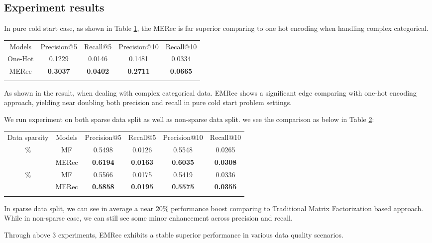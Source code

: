 \subsection{Experiment results}
In pure cold start case, as shown in Table \ref{tbl1}, the MERec is far superior comparing to one hot encoding when handling complex categorical.

\begin{table}
    {\begin{tabular}{@{}ccccc@{}}\toprule
    Models & Precision@5 & Recall@5 & Precision@10 & Recall@10 \\
    \colrule
    One-Hot\hphantom{00} & \hphantom{0} 0.1229 & \hphantom{0} 0.0146 & 0.1481 & 0.0334 \\
    MERec\hphantom{00} & \hphantom{0} \textbf{0.3037} & \hphantom{0} \textbf{0.0402} & \textbf{0.2711} & \textbf{0.0665} \\
    
    \botrule
    \end{tabular}
    }\label{tbl1}
    \end{table}
As shown in the result, when dealing with complex categorical data. EMRec shows a significant edge comparing with one-hot encoding approach, yielding near doubling both precision and recall in pure cold start problem settings.

We run experiment on both sparse data split as well as non-sparse data split. we see the comparison as below in Table \ref{tbl2}: 
\begin{table}
    {\begin{tabular}{@{}cccccc@{}}\toprule
    Data sparsity &Models & Precision@5 & Recall@5 & Precision@10 & Recall@10 \\
    \colrule
    1.1\%&MF\hphantom{00} & \hphantom{0} 0.5498 & 0.0126 & 0.5548 & 0.0265 \\
    &MERec\hphantom{00} & \hphantom{0} \textbf{0.6194} & \textbf{0.0163} & \textbf{0.6035} & \textbf{0.0308} \\
    \colrule
    2.3\%&MF\hphantom{00} & 0.5566 & 0.0175 & 0.5419 & 0.0336 \\
    &MERec\hphantom{00} & \hphantom{0} \textbf{0.5858} & \textbf{0.0195} & \textbf{0.5575} & \textbf{0.0355} \\
    \botrule
    \end{tabular}
    }
    \label{tbl2}
\end{table}
In sparse data split, we can see in average a near 20\% performance boost comparing to Traditional Matrix Factorization based approach. 
While in non-sparse case, we can still see some minor enhancement across precision and recall.

Through above 3 experiments, EMRec exhibits a stable superior performance in various data quality scenarios.

